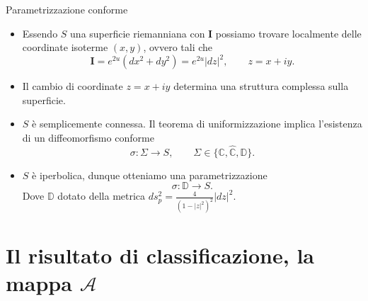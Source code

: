 \documentclass[aspectratio=169,11pt]{beamer}
\newcommand{\C}{\mathbb{C}}
\newcommand{\D}{\mathbb{D}}
\newcommand{\Amap}{\mathcal{A}}
\newcommand{\I}{\mathbf{I}}
\begin{document}
\begin{frame}{Parametrizzazione conforme}
\begin{itemize}
  \item Essendo $S$ una superficie riemanniana con $\I$ possiamo trovare localmente delle coordinate isoterme $(x,y)$, ovvero tali che
  \[
    \I=e^{2u}(dx^2+dy^2)=e^{2u}|dz|^2,
    \qquad z=x+iy.
  \]
  \item Il cambio di coordinate $z=x+iy$ determina una struttura complessa sulla superficie.
	\item $S$ è semplicemente connessa. Il teorema di uniformizzazione implica l'esistenza di un diffeomorfismo conforme
	\[
	\sigma:\Sigma \to S,
	\qquad
	\Sigma \in \{\C,\widehat{\C},\mathbb{D}\}.
	\]
  \item $S$ è iperbolica, dunque otteniamo una parametrizzazione
  \[
    \sigma:\D\to S.
  \]
  Dove $\D$ dotato della metrica $ ds_p^2=\frac{4}{(1-|z|^2)^2}|dz|^2$.
\end{itemize}

\section{Il risultato di classificazione, la mappa $\Amap$}
\end{frame}
\end{document}
